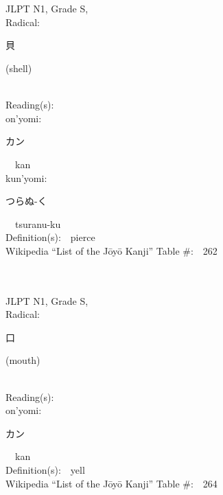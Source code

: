 \begin{multicols}{2}
\ \ \\
{\fontsize{34pt}{40pt}  }\ \ \\
{JLPT N1, Grade S, \\Radical:\ \ {\begin{CJK}{UTF8}{min} 貝 \end{CJK}} (shell) } \\
Reading(s):\ \ \\
{\hspace*{1em}}on'yomi:\ \ \\
{\hspace*{2em}}{\begin{CJK}{UTF8}{min} カン \end{CJK}}\ \ kan\ \ \\
{\hspace*{1em}}kun'yomi:\ \ \\
{\hspace*{2em}}{\begin{CJK}{UTF8}{min} つらぬ-く \end{CJK}}\ \ tsuranu-ku\ \ \\
Definition(s):\ \ pierce \\
Wikipedia ``List of the J\=oy\=o Kanji'' Table \#:\ \ 262 \\
\ \ \\
{\fontsize{34pt}{40pt}  }\ \ \\
{JLPT N1, Grade S, \\Radical:\ \ {\begin{CJK}{UTF8}{min} 口 \end{CJK}} (mouth) } \\
Reading(s):\ \ \\
{\hspace*{1em}}on'yomi:\ \ \\
{\hspace*{2em}}{\begin{CJK}{UTF8}{min} カン \end{CJK}}\ \ kan\ \ \\
Definition(s):\ \ yell \\
Wikipedia ``List of the J\=oy\=o Kanji'' Table \#:\ \ 264 \\
\ \ \\
{\fontsize{34pt}{40pt}  }\ \ \\

\end{multicols}
